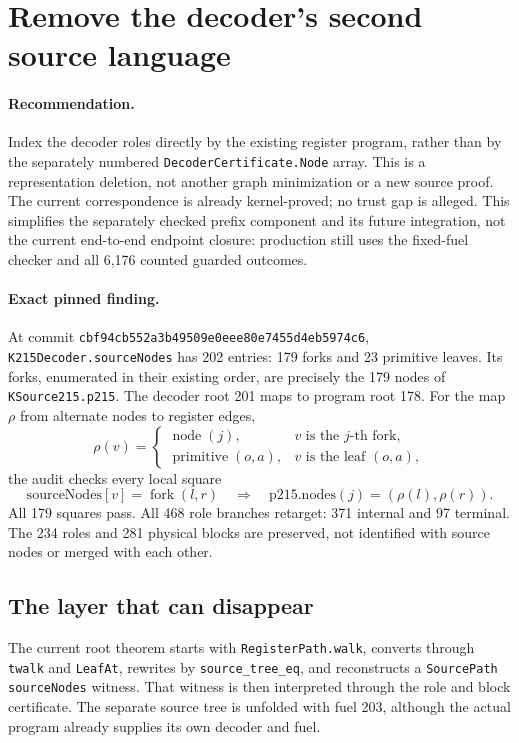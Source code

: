 \section{Remove the decoder's second source language}

\paragraph{Recommendation.}
Index the decoder roles directly by the existing register program, rather than
by the separately numbered \texttt{DecoderCertificate.Node} array. This is a
representation deletion, not another graph minimization or a new source proof.
The current correspondence is already kernel-proved; no trust gap is alleged.
This simplifies the separately checked prefix component and its future
integration, not the current end-to-end endpoint closure: production still
uses the fixed-fuel checker and all 6,176 counted guarded outcomes.

\paragraph{Exact pinned finding.}
At commit \texttt{cbf94cb552a3b49509e0eee80e7455d4eb5974c6},
\texttt{K215Decoder.sourceNodes} has 202 entries: 179 forks and 23 primitive
leaves. Its forks, enumerated in their existing order, are precisely the 179
nodes of \texttt{KSource215.p215}. The decoder root 201 maps to program root 178.
For the map $\rho$ from alternate nodes to register edges,
\[
 \rho(v)=
 \begin{cases}
   \operatorname{node}(j),&v\text{ is the }j\text{-th fork},\\
   \operatorname{primitive}(o,a),&v\text{ is the leaf }(o,a),
 \end{cases}
\]
the audit checks every local square
\[
 \mathrm{sourceNodes}[v]=\operatorname{fork}(l,r)
 \quad\Longrightarrow\quad
 \mathrm{p215.nodes}(j)=(\rho(l),\rho(r)).
\]
All 179 squares pass. All 468 role branches retarget: 371 internal and 97
terminal. The 234 roles and 281 physical blocks are preserved, not identified
with source nodes or merged with each other.

\subsection{The layer that can disappear}
The current root theorem starts with \texttt{RegisterPath.walk}, converts through
\texttt{twalk} and \texttt{LeafAt}, rewrites by
\texttt{source\_tree\_eq}, and reconstructs a
\texttt{SourcePath sourceNodes} witness. That witness is then interpreted through
the role and block certificate. The separate source tree is unfolded with fuel
203, although the actual program already supplies its own decoder and fuel.

